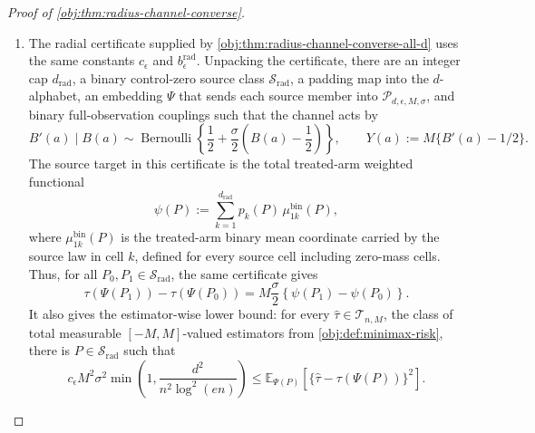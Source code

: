\begin{proof}[Proof of \cref{obj:thm:radius-channel-converse}]
\begin{enumerate}
\item The radial certificate supplied by \cref{obj:thm:radius-channel-converse-all-d} uses the same constants \(c_{\epsilon}\) and \(b_{\epsilon}^{\mathrm{rad}}\).  Unpacking the certificate, there are an integer cap \(d_{\mathrm{rad}}\), a binary control-zero source class \(\mathcal S_{\mathrm{rad}}\), a padding map into the \(d\)-alphabet, an embedding \(\Psi\) that sends each source member into \(\mathcal P_{d,\epsilon,M,\sigma}\), and binary full-observation couplings such that the channel acts by
\[
B'(a)\mid B(a)
\sim
\operatorname{Bernoulli}\!\left\{
\frac12+\frac{\sigma}{2}\left(B(a)-\frac12\right)
\right\},
\qquad
Y(a):=M\{B'(a)-1/2\}.
\]
The source target in this certificate is the total treated-arm weighted functional
\[
\psi(P)
:=
\sum_{k=1}^{d_{\mathrm{rad}}}
p_k(P)\,\mu_{1k}^{\mathrm{bin}}(P),
\]
where \(\mu_{1k}^{\mathrm{bin}}(P)\) is the treated-arm binary mean coordinate carried by the source law in cell \(k\), defined for every source cell including zero-mass cells.  Thus, for all \(P_0,P_1\in\mathcal S_{\mathrm{rad}}\), the same certificate gives
\[
\tau(\Psi(P_1))-\tau(\Psi(P_0))
=
M\frac{\sigma}{2}
\left\{
\psi(P_1)-\psi(P_0)
\right\}.
\]
It also gives the estimator-wise lower bound: for every
\(\widehat\tau\in\mathcal T_{n,M}\), the class of total measurable \([-M,M]\)-valued estimators from \cref{obj:def:minimax-risk}, there is \(P\in\mathcal S_{\mathrm{rad}}\) such that
\[
c_{\epsilon}M^2\sigma^2
\min\left(1,\frac{d^2}{n^2\log^2(en)}\right)
\le
\mathbb E_{\Psi(P)}
\left[
\{\widehat\tau-\tau(\Psi(P))\}^2
\right].
\] %
\end{enumerate}
\end{proof}

